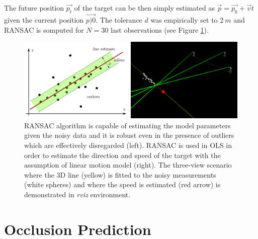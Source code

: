 The future position $\vec{p_{t}}$ of the target can be then simply estimated as $\vec{p} = \vec{p_{0}} + \vec{v}t$ given the current position $\vec{p){0}}$. The tolerance $d$ was empirically set to $2~m$ and RANSAC is somputed for $N = 30$ last observations (see Figure \ref{fig:ransac}).

\begin{figure}[htb]
	\centering
	\includegraphics[width=0.8\linewidth]{fig/ransac_theory_rviz.png}
	\caption{RANSAC algorithm is capable of estimating the model parameters given the noisy data and it is robust even in the presence of outliers which are effectively disregarded (left). RANSAC is used in OLS in order to estimate the direction and speed of the target with the assumption of linear motion model (right). The three-view scenario where the 3D line (yellow) is fitted to the noisy measurements (white spheres) and where the speed is estimated (red arrow) is demonstrated in \textit{rviz} environment.}
	\label{fig:ransac}
\end{figure}

\section{Occlusion Prediction} \label{txt:occlusion_prediction}

